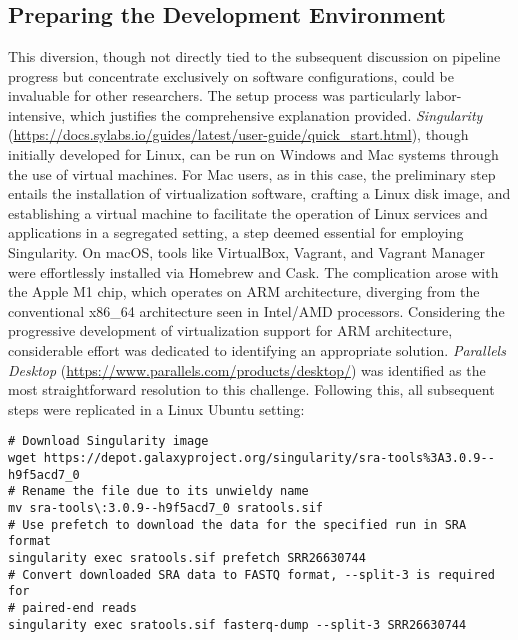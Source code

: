 \appendix

\chapter{}

\section{Preparing the Development Environment}

This diversion, though not directly tied to the subsequent discussion on pipeline progress but concentrate exclusively on software configurations, could be invaluable for other researchers. The setup process was particularly labor-intensive, which justifies the comprehensive explanation provided. \textit{Singularity} (\url{https://docs.sylabs.io/guides/latest/user-guide/quick_start.html}), though initially developed for Linux, can be run on Windows and Mac systems through the use of virtual machines. For Mac users, as in this case, the preliminary step entails the installation of virtualization software, crafting a Linux disk image, and establishing a virtual machine to facilitate the operation of Linux services and applications in a segregated setting, a step deemed essential for employing Singularity. On macOS, tools like VirtualBox, Vagrant, and Vagrant Manager were effortlessly installed via Homebrew and Cask. The complication arose with the Apple M1 chip, which operates on ARM architecture, diverging from the conventional x86\_64 architecture seen in Intel/AMD processors. Considering the progressive development of virtualization support for ARM architecture, considerable effort was dedicated to identifying an appropriate solution. \textit{Parallels Desktop} (\url{https://www.parallels.com/products/desktop/}) was identified as the most straightforward resolution to this challenge. Following this, all subsequent steps were replicated in a Linux Ubuntu setting:

\begin{verbatim}
# Download Singularity image
wget https://depot.galaxyproject.org/singularity/sra-tools%3A3.0.9--h9f5acd7_0
# Rename the file due to its unwieldy name
mv sra-tools\:3.0.9--h9f5acd7_0 sratools.sif
# Use prefetch to download the data for the specified run in SRA format
singularity exec sratools.sif prefetch SRR26630744
# Convert downloaded SRA data to FASTQ format, --split-3 is required for
# paired-end reads
singularity exec sratools.sif fasterq-dump --split-3 SRR26630744
\end{verbatim}

